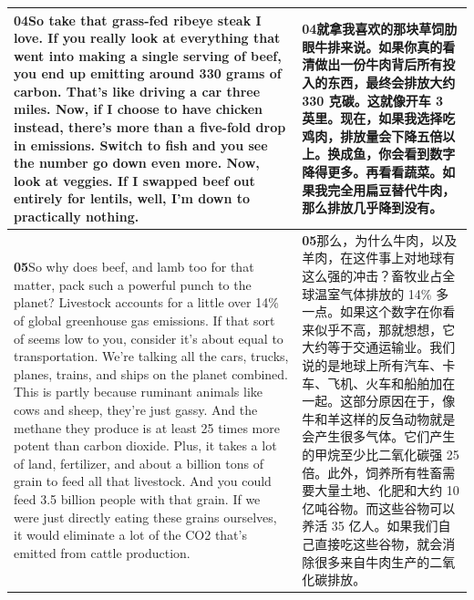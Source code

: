 \documentclass[UTF8,zihao=-4,fontset=fandol]{ctexart}
\newcommand{\TranscriptColumn}{\raggedright\arraybackslash\hyphenpenalty=10000\exhyphenpenalty=10000\sloppy}
\begin{document}
\begin{longtable}{>{\TranscriptColumn}p{} >{\TranscriptColumn}p{}}
\textbf{04}\quad So take that grass-fed ribeye steak I love. If you really look at everything that went into making a single serving of beef, you end up emitting around 330 grams of carbon. That's like driving a car three miles. Now, if I choose to have chicken instead, there's more than a five-fold drop in emissions. Switch to fish and you see the number go down even more. Now, look at veggies. If I swapped beef out entirely for lentils, well, I'm down to practically nothing. & \textbf{04}\quad 就拿我喜欢的那块草饲肋眼牛排来说。如果你真的看清做出一份牛肉背后所有投入的东西，最终会排放大约 330 克碳。这就像开车 3 英里。现在，如果我选择吃鸡肉，排放量会下降五倍以上。换成鱼，你会看到数字降得更多。再看看蔬菜。如果我完全用扁豆替代牛肉，那么排放几乎降到没有。 \\ \hline
\textbf{05}\quad So why does beef, and lamb too for that matter, pack such a powerful punch to the planet? Livestock accounts for a little over 14\% of global greenhouse gas emissions. If that sort of seems low to you, consider it's about equal to transportation. We're talking all the cars, trucks, planes, trains, and ships on the planet combined. This is partly because ruminant animals like cows and sheep, they're just gassy. And the methane they produce is at least 25 times more potent than carbon dioxide. Plus, it takes a lot of land, fertilizer, and about a billion tons of grain to feed all that livestock. And you could feed 3.5 billion people with that grain. If we were just directly eating these grains ourselves, it would eliminate a lot of the CO2 that's emitted from cattle production. & \textbf{05}\quad 那么，为什么牛肉，以及羊肉，在这件事上对地球有这么强的冲击？畜牧业占全球温室气体排放的 14\% 多一点。如果这个数字在你看来似乎不高，那就想想，它大约等于交通运输业。我们说的是地球上所有汽车、卡车、飞机、火车和船舶加在一起。这部分原因在于，像牛和羊这样的反刍动物就是会产生很多气体。它们产生的甲烷至少比二氧化碳强 25 倍。此外，饲养所有牲畜需要大量土地、化肥和大约 10 亿吨谷物。而这些谷物可以养活 35 亿人。如果我们自己直接吃这些谷物，就会消除很多来自牛肉生产的二氧化碳排放。 \\ \hline

\end{longtable}
\end{document}
